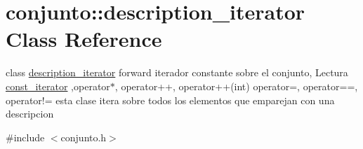 \hypertarget{classconjunto_1_1description__iterator}{}\section{conjunto\+:\+:description\+\_\+iterator Class Reference}
\label{classconjunto_1_1description__iterator}


class \hyperlink{classconjunto_1_1description__iterator}{description\+\_\+iterator} forward iterador constante sobre el conjunto, Lectura \hyperlink{classconjunto_1_1const__iterator}{const\+\_\+iterator} ,operator$\ast$, operator++, operator++(int) operator=, operator==, operator!= esta clase itera sobre todos los elementos que emparejan con una descripcion  




{\ttfamily \#include $<$conjunto.\+h$>$}

